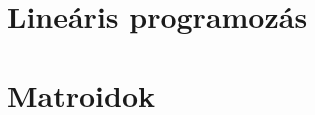 \documentclass[a4paper,12pt,oneside,openright]{report}
\begin{document}


\tableofcontents
\chapter{Lineáris programozás}







\chapter{Matroidok}


\end{document}
